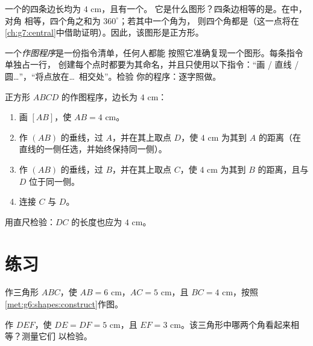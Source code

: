 \begin{example}[由性质识别图形]\label{ex:g6:shapes:recognize}
一个的四条边长均为 $4$ cm，且有一个。
它是什么图形？四条边相等的是。在中，对角
相等，四个角之和为 $360^\circ$；若其中一个角为，
则四个角都是（这一点将在
\cref{ch:g7:central}中借助证明）。因此，该图形是正方形。
\end{example}

\begin{method}[作图程序]\label{met:g6:shapes:program}
一个\emph{作图程序}是一份指令清单，任何人都能
按照它准确复现一个图形。每条指令单独占一行，
创建每个点时都要为其命名，并且只使用以下指令：“画
/ 直线 / 圆\dots”，“将点放在\dots\ 相交处”。检验
你的程序：逐字照做。
\end{method}

\begin{example}\label{ex:g6:shapes:program}
正方形 $ABCD$ 的作图程序，边长为 $4$ cm：
\begin{enumerate}
  \item 画 $[AB]$，使 $AB = 4$ cm。
  \item 作 $(AB)$ 的垂线，过 $A$，并在其上取点
        $D$，使 $4$ cm 为其到 $A$ 的距离（在直线的一侧任选，并始终保持同一侧）。
  \item 作 $(AB)$ 的垂线，过 $B$，并在其上取点
        $C$，使 $4$ cm 为其到 $B$ 的距离，且与 $D$ 位于同一侧。
  \item 连接 $C$ 与 $D$。
\end{enumerate}
用直尺检验：$DC$ 的长度也应为 $4$ cm。
\end{example}

\section{练习}

\begin{exercise}[$\star$]\label{exo:g6:shapes:1}
作三角形 $ABC$，使 $AB = 6$ cm，$AC = 5$ cm，且
$BC = 4$ cm，按照\cref{met:g6:shapes:construct}作图。
\end{exercise}

\begin{exercise}[$\star$]\label{exo:g6:shapes:2}
作 $DEF$，使 $DE = DF = 5$ cm，且
$EF = 3$ cm。该三角形中哪两个角看起来相等？测量它们
以检验。
\end{exercise}

